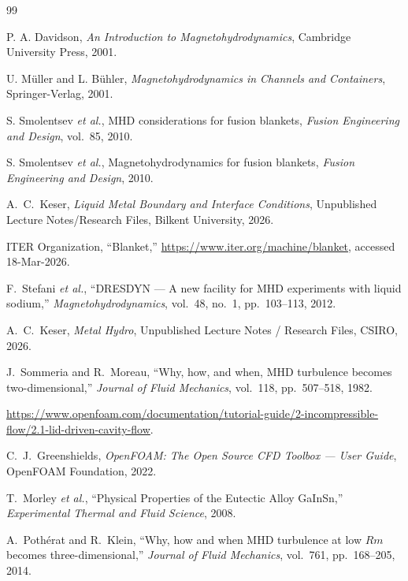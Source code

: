 \documentclass[aps,prl,twocolumn,superscriptaddress]{revtex4-2}
\begin{document}
\begin{thebibliography}{99}

P. A. Davidson, \textit{An Introduction to Magnetohydrodynamics},
Cambridge University Press, 2001.

U. M\"uller and L. B\"uhler, \textit{Magnetohydrodynamics in Channels
and Containers}, Springer-Verlag, 2001.

S. Smolentsev \emph{et al.}, MHD considerations for fusion blankets,
\textit{Fusion Engineering and Design}, vol.\ 85, 2010.

S. Smolentsev \emph{et al.}, Magnetohydrodynamics for fusion blankets,
\textit{Fusion Engineering and Design}, 2010.

A.~C.~Keser, \textit{Liquid Metal Boundary and Interface Conditions},
Unpublished Lecture Notes/Research Files, Bilkent University, 2026.

ITER Organization, ``Blanket,''
\url{https://www.iter.org/machine/blanket}, accessed 18-Mar-2026.

F.~Stefani \emph{et al.}, ``DRESDYN --- A new facility for MHD
experiments with liquid sodium,'' \textit{Magnetohydrodynamics},
vol.\ 48, no.\ 1, pp.\ 103--113, 2012.

A.~C.~Keser, \textit{Metal Hydro}, Unpublished Lecture Notes /
Research Files, CSIRO, 2026.

J.~Sommeria and R.~Moreau, ``Why, how, and when, MHD turbulence
becomes two-dimensional,'' \textit{Journal of Fluid Mechanics},
vol.\ 118, pp.\ 507--518, 1982.

\url{https://www.openfoam.com/documentation/tutorial-guide/2-incompressible-flow/2.1-lid-driven-cavity-flow}.

C.~J.~Greenshields, \textit{OpenFOAM: The Open Source CFD Toolbox ---
User Guide}, OpenFOAM Foundation, 2022.

T.~Morley \emph{et al.}, ``Physical Properties of the Eutectic Alloy
GaInSn,'' \textit{Experimental Thermal and Fluid Science}, 2008.

A.~Poth\'erat and R.~Klein, ``Why, how and when MHD turbulence at
low $Rm$ becomes three-dimensional,'' \textit{Journal of Fluid
Mechanics}, vol.~761, pp.~168--205, 2014.

\end{thebibliography}
\end{document}
